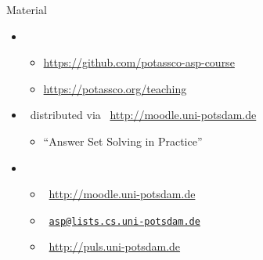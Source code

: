 \begin{frame}{Material}
  \bigskip
  \begin{itemize}\itemsep 0pt
  \item {}
    \begin{itemize}
    \item \url{https://github.com/potassco-asp-course}
    \item \url{https://potassco.org/teaching}
    \end{itemize}
    \medskip
  \item {} \ distributed via \ \url{http://moodle.uni-potsdam.de}
    \begin{itemize}
    \item {} ``Answer Set Solving in Practice''
    \end{itemize}
    \medskip
  \item {}
    \begin{itemize}
    \item {}      \ \url{http://moodle.uni-potsdam.de}
    \item {}          \ \href{mailto:asp@lists.cs.uni-potsdam.de}{\texttt{asp@lists.cs.uni-potsdam.de}}
    \item {} \ \url{http://puls.uni-potsdam.de}
    \end{itemize}
    \medskip
  \end{itemize}
\end{frame}
